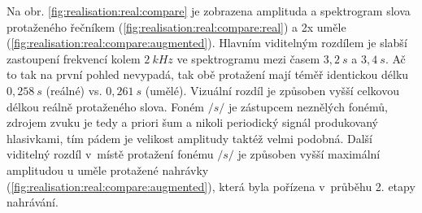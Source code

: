 Na obr. \ref{fig:realisation:real:compare} je zobrazena amplituda a spektrogram slova  protaženého řečníkem (\ref{fig:realisation:real:compare:real}) a 2x uměle (\ref{fig:realisation:real:compare:augmented}).
Hlavním viditelným rozdílem je slabší zastoupení frekvencí kolem $2\ kHz$ ve spektrogramu mezi časem $3,2\ s$ a $3,4\ s$.
Ač to tak na první pohled nevypadá, tak obě protažení mají téměř identickou délku $0,258\ s$ (reálné) vs. $0,261\ s$ (umělé).
Vizuální rozdíl je způsoben vyšší celkovou délkou reálně protaženého slova.
Foném $/s/$ je zástupcem neznělých fonémů, zdrojem zvuku je tedy a priori šum a nikoli periodický signál produkovaný hlasivkami, tím pádem je velikost amplitudy taktéž velmi podobná.
Další viditelný rozdíl v~místě protažení fonému $/s/$ je způsoben vyšší maximální amplitudou u uměle protažené nahrávky (\ref{fig:realisation:real:compare:augmented}), která byla pořízena v~průběhu 2. etapy nahrávání.

